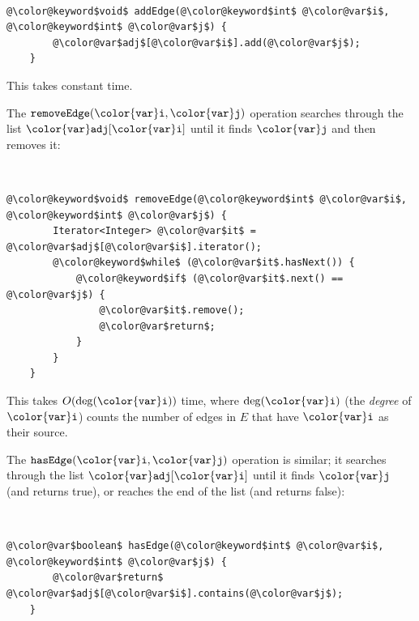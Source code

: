 \documentclass[10pt]{book}
\theoremstyle{plain}
\theoremstyle{definition}
\begin{document}
 \ \vspace{.5ex}\begin{Verbatim}[gobble=1,tabsize=2,frame=single,framerule=1.2pt,commandchars=\\@\$,label=\texttt{AdjacencyLists},labelposition=topline]
	@\color@keyword$void$ addEdge(@\color@keyword$int$ @\color@var$i$, @\color@keyword$int$ @\color@var$j$) {
		@\color@var$adj$[@\color@var$i$].add(@\color@var$j$);
	}
\end{Verbatim}

This takes constant time.

The \ensuremath{\mathtt{removeEdge({\color{var}i},{\color{var}j})}} operation searches through the list \ensuremath{\mathtt{{\color{var}adj}[{\color{var}i}]}}
until it finds \ensuremath{\mathtt{{\color{var}j}}} and then removes it:


 \ \vspace{.5ex}\begin{Verbatim}[gobble=1,tabsize=2,frame=single,framerule=1.2pt,commandchars=\\@\$,label=\texttt{AdjacencyLists},labelposition=topline]
	@\color@keyword$void$ removeEdge(@\color@keyword$int$ @\color@var$i$, @\color@keyword$int$ @\color@var$j$) {
		Iterator<Integer> @\color@var$it$ = @\color@var$adj$[@\color@var$i$].iterator();
		@\color@keyword$while$ (@\color@var$it$.hasNext()) {
			@\color@keyword$if$ (@\color@var$it$.next() == @\color@var$j$) {
				@\color@var$it$.remove();
				@\color@var$return$;
			}
		}	
	}
\end{Verbatim}

This takes $O(\deg(\ensuremath{\mathtt{{\color{var}i}}}))$ time, where $\deg(\ensuremath{\mathtt{{\color{var}i}}})$ (the \emph{degree}
%
of
$\ensuremath{\mathtt{{\color{var}i}}}$) counts the number of edges in $E$ that have $\ensuremath{\mathtt{{\color{var}i}}}$ as their source.

The \ensuremath{\mathtt{hasEdge({\color{var}i},{\color{var}j})}} operation is similar;  it searches through the list
\ensuremath{\mathtt{{\color{var}adj}[{\color{var}i}]}} until it finds \ensuremath{\mathtt{{\color{var}j}}} (and returns true), or reaches the end of
the list (and returns false):


 \ \vspace{.5ex}\begin{Verbatim}[gobble=1,tabsize=2,frame=single,framerule=1.2pt,commandchars=\\@\$,label=\texttt{AdjacencyLists},labelposition=topline]
	@\color@var$boolean$ hasEdge(@\color@keyword$int$ @\color@var$i$, @\color@keyword$int$ @\color@var$j$) {
		@\color@var$return$ @\color@var$adj$[@\color@var$i$].contains(@\color@var$j$);
	}
\end{Verbatim}
\end{document}
